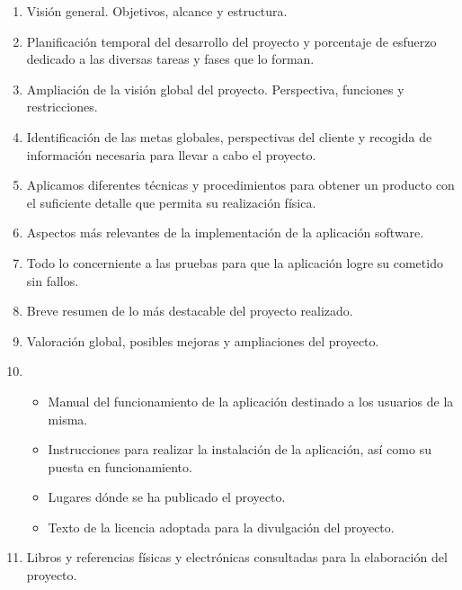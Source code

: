 \begin{enumerate}
\item {} Visión general. Objetivos, alcance y estructura.
\item {} Planificación temporal del desarrollo del
  proyecto y porcentaje de esfuerzo dedicado a las diversas tareas y fases que
  lo forman.
\item {} Ampliación de la visión
  global del proyecto. Perspectiva, funciones y restricciones.
\item {} Identificación de las metas globales, perspectivas
  del cliente y recogida de información necesaria para llevar a cabo el
  proyecto.
\item {} Aplicamos diferentes técnicas y procedimientos para
  obtener un producto con el suficiente detalle que permita su realización
  física.
\item {} Aspectos más relevantes de la implementación de
  la aplicación software.
\item {} Todo lo concerniente a las pruebas para que la
  aplicación logre su cometido sin fallos.
\item {} Breve resumen de lo más destacable del proyecto
  realizado.
\item {} Valoración global, posibles mejoras y
  ampliaciones del proyecto.
\item {}
  \begin{itemize}
  \item {} Manual del funcionamiento de la aplicación
    destinado a los usuarios de la misma.
  \item {}
    Instrucciones para realizar la instalación de la aplicación, así como su
    puesta en funcionamiento.
  \item {} Lugares dónde se ha publicado el proyecto.
  \item {} Texto de la licencia adoptada para la divulgación
    del proyecto.
  \end{itemize}
\item {} Libros y referencias físicas y electrónicas
  consultadas para la elaboración del proyecto.
\end{enumerate}
